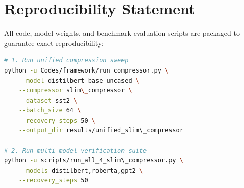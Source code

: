\section{Reproducibility Statement}
All code, model weights, and benchmark evaluation scripts are packaged to guarantee exact reproducibility:
\begin{lstlisting}[language=bash]
# 1. Run unified compression sweep
python -u Codes/framework/run_compressor.py \
    --model distilbert-base-uncased \
    --compressor slim\_compressor \
    --dataset sst2 \
    --batch_size 64 \
    --recovery_steps 50 \
    --output_dir results/unified_slim\_compressor

# 2. Run multi-model verification suite
python -u scripts/run_all_4_slim\_compressor.py \
    --models distilbert,roberta,gpt2 \
    --recovery_steps 50
\end{lstlisting}
